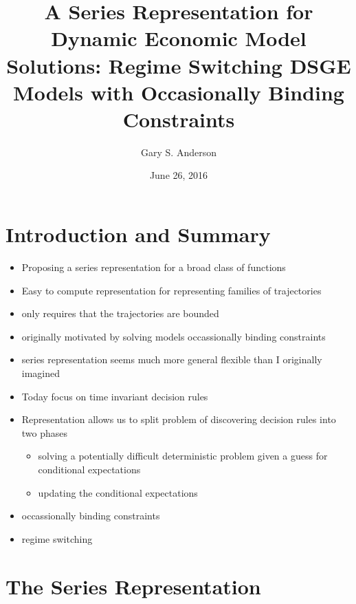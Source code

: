 \documentclass[tikz]{beamer}
\begin{document}
\title[A Series Representation  for Solving  Models]{A Series Representation for Dynamic Economic Model Solutions: Regime Switching DSGE Models with Occasionally Binding Constraints }


\author{Gary S. Anderson}
\date{June 26, 2016} 


\frame{\titlepage}

\section{Introduction and Summary}

\begin{frame}

 \begin{itemize}
 \item Proposing a series representation for a broad class of functions
 \item Easy to compute representation for representing
families of trajectories
\item only requires that the trajectories are bounded
\item originally motivated by solving models occassionally binding constraints
\item series representation seems much more general flexible than I originally imagined
\end{itemize}
\end{frame}


\begin{frame}
     \begin{itemize}
   \item Today focus on time invariant decision rules 
   \item Representation allows us to split problem of discovering decision rules into two phases
     \begin{itemize}
     \item solving a potentially difficult deterministic problem given a guess for conditional expectations
     \item updating the conditional expectations
   \end{itemize}
     \item occassionally binding constraints
     \item regime switching
\end{itemize}

\end{frame}
\section{The Series Representation}
\end{document}
